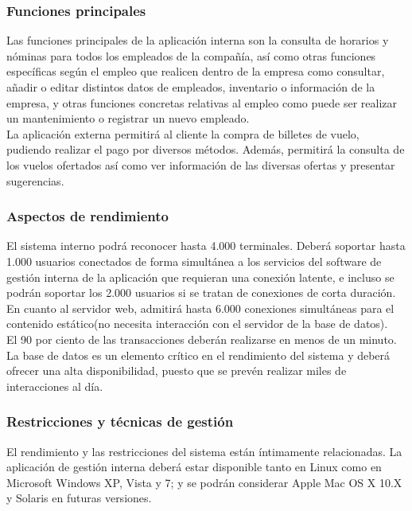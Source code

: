 \documentclass[11pt, a4paper, twoside, titlepage]{article}
\begin{document}
			\subsubsection{Funciones principales}
			Las funciones principales de la aplicación interna son la consulta de horarios y nóminas para todos los empleados de la compañía, así como otras funciones específicas según el empleo que realicen dentro de la empresa como consultar, añadir o editar distintos datos de empleados, inventario o información de la empresa, y otras funciones concretas relativas al empleo como puede ser realizar un mantenimiento o registrar un nuevo empleado. \\

			La aplicación externa permitirá al cliente la compra de billetes de vuelo, pudiendo realizar el pago por diversos métodos. Además, permitirá la consulta de los vuelos ofertados así como ver información de las diversas ofertas y presentar sugerencias.
			
			\subsubsection{Aspectos de rendimiento}
			El sistema interno podrá reconocer hasta 4.000 terminales. Deberá soportar hasta 1.000 usuarios conectados de forma simultánea a los servicios del software de gestión interna de la aplicación que requieran una conexión latente, e incluso se podrán soportar los 2.000 usuarios si se tratan de conexiones de corta duración.  En cuanto al servidor web, admitirá hasta 6.000 conexiones simultáneas para el contenido estático(no necesita interacción con el servidor de la base de datos). \\

			El 90 por ciento de las transacciones deberán realizarse en menos de un minuto. La base de datos es un elemento crítico en el rendimiento del sistema y deberá ofrecer una alta disponibilidad, puesto que se prevén realizar miles de interacciones al día.

			\subsubsection{Restricciones y técnicas de gestión}
			El rendimiento y las restricciones del sistema están íntimamente relacionadas. La aplicación de gestión interna deberá estar disponible tanto en Linux como en Microsoft Windows XP, Vista y 7; y se podrán considerar Apple Mac OS X 10.X y Solaris en futuras versiones.  \\
\end{document}
